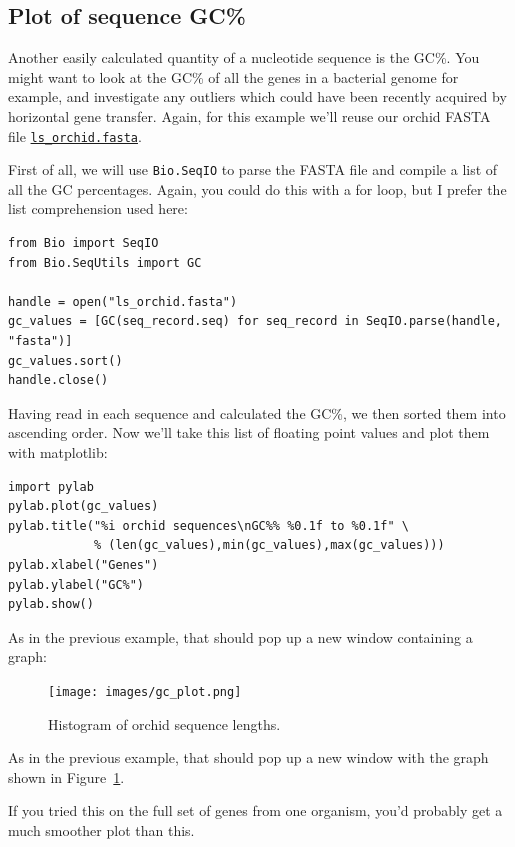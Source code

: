 \documentclass{report}
\begin{document}
\subsection{Plot of sequence GC\%}

Another easily calculated quantity of a nucleotide sequence is the GC\%.  You might
want to look at the GC\% of all the genes in a bacterial genome for example, and
investigate any outliers which could have been recently acquired by horizontal gene
transfer.  Again, for this example we'll reuse our orchid FASTA file \href{http://biopython.org/DIST/docs/tutorial/examples/ls_orchid.fasta}{\tt ls\_orchid.fasta}.

First of all, we will use \verb|Bio.SeqIO| to parse the FASTA file and compile a list
of all the GC percentages.  Again, you could do this with a for loop, but I prefer the
list comprehension used here:

\begin{verbatim}
from Bio import SeqIO
from Bio.SeqUtils import GC

handle = open("ls_orchid.fasta")
gc_values = [GC(seq_record.seq) for seq_record in SeqIO.parse(handle, "fasta")]
gc_values.sort()
handle.close()
\end{verbatim}

Having read in each sequence and calculated the GC\%, we then sorted them into ascending
order. Now we'll take this list of floating point values and plot them with matplotlib:

\begin{verbatim}
import pylab
pylab.plot(gc_values)
pylab.title("%i orchid sequences\nGC%% %0.1f to %0.1f" \
            % (len(gc_values),min(gc_values),max(gc_values)))
pylab.xlabel("Genes")
pylab.ylabel("GC%")
pylab.show()
\end{verbatim}

%
%
\begin{htmlonly}
\noindent As in the previous example, that should pop up a new window containing a graph:


\end{htmlonly}
%
%
\begin{latexonly}
\begin{figure}[htbp]
\centering
\texttt{[image: images/gc\_plot.png]}
\caption{Histogram of orchid sequence lengths.}
\label{fig:seq-gc-plot}
\end{figure}
\noindent As in the previous example, that should pop up a new window with the graph shown in Figure~\ref{fig:seq-gc-plot}.
\end{latexonly}
%
%
If you tried this on the full set of genes from one organism, you'd probably get a much
smoother plot than this.
\end{document}
